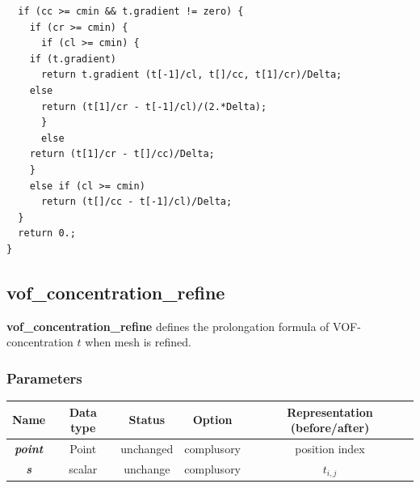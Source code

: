 \documentclass[a4paper]{article}
\newcommand{\func}[1]{\textbf{\textcolor{function}{#1}}}
\newcommand{\para}[1]{\textbf{\emph{\textcolor{para}{#1}}}}
\begin{document}
\begin{multicols}{2}
 \columnbreak
 \begin{verbatim}
  if (cc >= cmin && t.gradient != zero) {
    if (cr >= cmin) {
      if (cl >= cmin) {
	if (t.gradient)
	  return t.gradient (t[-1]/cl, t[]/cc, t[1]/cr)/Delta;
	else
	  return (t[1]/cr - t[-1]/cl)/(2.*Delta);
      }
      else
	return (t[1]/cr - t[]/cc)/Delta;
    }
    else if (cl >= cmin)
      return (t[]/cc - t[-1]/cl)/Delta;
  }
  return 0.;
}
 \end{verbatim}
\end{multicols}
\subsection{\func{vof\_concentration\_refine}}
\func{vof\_concentration\_refine} defines the prolongation formula of VOF-concentration $t$ when mesh is refined.
\subsubsection{Parameters}
\begin{table}[h]
  \centering
  \begin{tabular}{|c|c|c|c|c|}
    \hline
    Name & Data type & Status & Option & Representation (before/after)\\[0.5ex]
    \hline\hline
    \para{point} & Point & unchanged & complusory & position index\\
    \hline
    \para{s} & scalar & unchange & complusory & $t_{i,j}$\\
    \hline
  \end{tabular}
\end{table}
\end{document}
